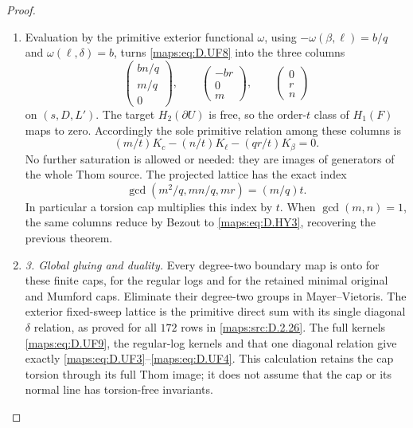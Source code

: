 \begin{proof}
\begin{enumerate}[label=\arabic*.,leftmargin=*]
\item Evaluation by the primitive exterior functional $\omega$,
using $-\omega(\beta,\ell)=b/q$ and
$\omega(\ell,\delta)=b$, turns \eqref{maps:eq:D.UF8} into the three columns
\[
 \begin{pmatrix}bn/q\\m/q\\0\end{pmatrix},\qquad
 \begin{pmatrix}-br\\0\\m\end{pmatrix},\qquad
 \begin{pmatrix}0\\r\\n\end{pmatrix}                       \tag{D.UF9}\label{maps:eq:D.UF9}
\]
on $(s,D,L')$. The target $H_2(\partial U)$ is free, so the
order-$t$ class of $H_1(F)$ maps to zero. Accordingly the sole
primitive relation among these columns is
\[
 (m/t)K_c-(n/t)K_\ell-(qr/t)K_\beta=0.
\]
No further saturation is allowed or needed: they are images
of generators of the whole Thom source. The projected
lattice has the exact index
\[
 \gcd\left(m^2/q,mn/q,mr\right)=(m/q)t.                    \tag{D.UF10}\label{maps:eq:D.UF10}
\]
In particular a torsion cap multiplies this index by $t$.
When $\gcd(m,n)=1$, the same columns reduce by Bezout to
\eqref{maps:eq:D.HY3}, recovering the previous theorem.

\item \emph{3. Global gluing and duality.}
Every degree-two boundary map is onto for these finite caps,
for the regular logs and for the retained minimal original and
Mumford caps. Eliminate their degree-two groups in
Mayer--Vietoris. The exterior fixed-sweep lattice is the
primitive direct sum with its single diagonal $\delta$
relation, as proved for all $172$ rows in \ref{maps:src:D.2.26}.
The full kernels \eqref{maps:eq:D.UF9}, the regular-log kernels and that
one diagonal relation give exactly \eqref{maps:eq:D.UF3}--\eqref{maps:eq:D.UF4}.
This calculation retains the cap torsion through its full
Thom image; it does not assume that the cap or its normal
line has torsion-free invariants.


\end{enumerate}
\end{proof}
